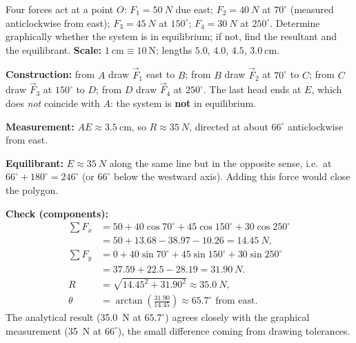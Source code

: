 \documentclass[11pt]{article}
\begin{document}
\begin{exoresolu}
Four forces act at a point $O$: $F_1 = \SI{50}{N}$ due east; $F_2 = \SI{40}{N}$ at $70^{\circ}$ (measured anticlockwise from east); $F_3 = \SI{45}{N}$ at $150^{\circ}$; $F_4 = \SI{30}{N}$ at $250^{\circ}$. Determine graphically whether the system is in equilibrium; if not, find the resultant and the equilibrant.
\tcblower
\textbf{Scale:} $1\ \mathrm{cm} \equiv 10\ \mathrm{N}$; lengths $5.0$, $4.0$, $4.5$, $3.0\ \mathrm{cm}$.

\textbf{Construction:} from $A$ draw $\vec{F}_1$ east to $B$; from $B$ draw $\vec{F}_2$ at $70^{\circ}$ to $C$; from $C$ draw $\vec{F}_3$ at $150^{\circ}$ to $D$; from $D$ draw $\vec{F}_4$ at $250^{\circ}$. The last head ends at $E$, which does \emph{not} coincide with $A$: the system is \textbf{not} in equilibrium.

\textbf{Measurement:} $AE \approx 3.5\ \mathrm{cm}$, so $R \approx \SI{35}{N}$, directed at about $66^{\circ}$ anticlockwise from east.

\textbf{Equilibrant:} $E \approx \SI{35}{N}$ along the same line but in the opposite sense, i.e.\ at $66^{\circ} + 180^{\circ} = 246^{\circ}$ (or $66^{\circ}$ below the westward axis). Adding this force would close the polygon.

\textbf{Check (components):} 
\begin{align*}
\sum F_x &= 50 + 40\cos 70^{\circ} + 45\cos 150^{\circ} + 30\cos 250^{\circ} \\
&= 50 + 13.68 - 38.97 - 10.26 = \SI{14.45}{N}, \\
\sum F_y &= 0 + 40\sin 70^{\circ} + 45\sin 150^{\circ} + 30\sin 250^{\circ} \\
&= 37.59 + 22.5 - 28.19 = \SI{31.90}{N}. \\
R &= \sqrt{14.45^2 + 31.90^2} \approx \SI{35.0}{N}, \\
\theta &= \arctan\left(\frac{31.90}{14.45}\right) \approx 65.7^{\circ} \text{ from east}.
\end{align*}
The analytical result (\SI{35.0}{N} at $65.7^{\circ}$) agrees closely with the graphical measurement (\SI{35}{N} at $66^{\circ}$), the small difference coming from drawing tolerances.
\end{exoresolu}
\end{document}
